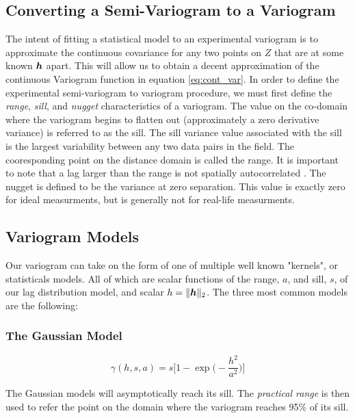 \documentclass[11pt]{ucthesis}
\newcommand{\vect}[1]{{\it{\boldsymbol{#1}}}}
\begin{document}
\subsection{Converting a Semi-Variogram to a Variogram}
The intent of fitting a statistical model to an experimental variogram is to approximate the continuous covariance for any two points on $Z$ that are at some known $\vect{h}$ apart. This will allow us to obtain a decent approximation of the continuous Variogram function in equation \ref{eq:cont_var}. In order to define the experimental semi-variogram to variogram procedure, we must first define the \textit{range}, \textit{sill}, and \textit{nugget} characteristics of a variogram. The value on the co-domain where the variogram begins to flatten out (approximately a zero derivative variance) is referred to as the sill. The sill variance value associated with the sill is the largest variability between any two data pairs in the field. The cooresponding point on the distance domain is called the range. It is important to note that a lag larger than the range is not spatially autocorrelated \cite{felus:srn}. The nugget is defined to be the variance at zero separation. This value is exactly zero for ideal measurments, but is generally not for real-life measurments.

\subsection{Variogram Models}
Our variogram can take on the form of one of multiple well known "kernels", or statisticals models. All of which are scalar functions of the range, $a$, and sill, $s$, of our lag distribution model, and scalar $h = \|\vect{h}\|_2$. The three most common models are the following: %
\subsubsection{The Gaussian Model}

\begin{equation}
	\gamma(h, s, a) = s \Bigg[ 1 - \exp \Bigg( -\dfrac{h^2}{a^2} \Bigg) \Bigg]
	\label{eq:gauss_model}
\end{equation}

The Gaussian models will asymptotically reach its sill. The \textit{practical range} is then used to refer the point on the domain where the variogram reaches 95\% of its sill.
\end{document}
